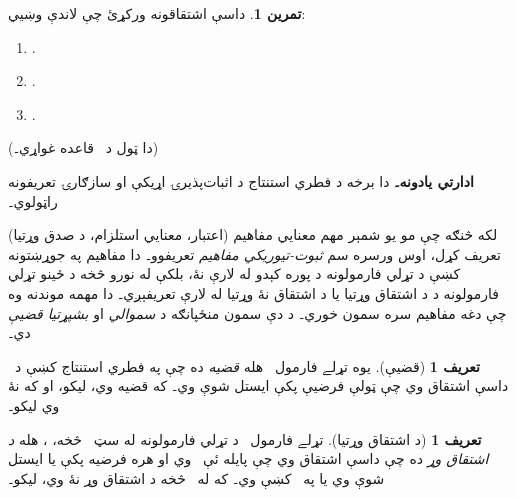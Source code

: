 \documentclass[12pt,a4paper,oneside]{report}
\newcommand{\olfileid}[3]{\gdef\pspart{#1}\gdef\pschapter{#2}\gdef\pssection{#3}}
\gdef\pspart{#2}\gdef\pschapter{#3}\gdef\pssection{}%
\theoremstyle{definition}
\newtheorem{defn}[thm]{تعريف}
\newtheorem{prob}[thm]{تمرين}
\newenvironment{editorial}{\begin{framed}\textbf{ادارتي يادونه۔}\enspace}{\end{framed}}
\newenvironment{explain}{}{}
\begin{document}
\label{olpseg:OLP-0090-B015:start}
\begin{prob}
داسې اشتقاقونه ورکړئ چې لاندې وښيي:
\begin{enumerate}
\item \LR{$\Proves \lnot\lforall[x][!A(x)] \lif \lexists[x][\lnot!A(x)]$}.
\item {}.
\item {}.
\end{enumerate}
(دا ټول د~\LR{$\FalseCl$} قاعده غواړي۔)
\end{prob}
\label{olpseg:OLP-0090-B015:end}

\label{olpseg:OLP-0091-B004:start}
\olfileid{fol}{ntd}{ptn}
\label{olpseg:OLP-0091-B004:end}

\label{olpseg:OLP-0091-B005:start}
\label{olpseg:OLP-0091-B005:end}

\label{olpseg:OLP-0091-B006:start}
\begin{editorial}
دا برخه د فطري استنتاج د اثبات‌پذيرۍ اړيکې او سازګارۍ تعريفونه
راټولوي۔
\end{editorial}
\label{olpseg:OLP-0091-B006:end}

\label{olpseg:OLP-0091-B007:start}
\begin{explain}
لکه څنګه چې مو يو شمېر مهم معنايي مفاهيم (اعتبار، معنايي استلزام،
د صدق وړتيا) تعريف کړل، اوس ورسره سم \emph{ثبوت-تيوريکي مفاهيم}
تعريفوو۔ دا مفاهيم په جوړښتونه کښې د تړلي فارمولونه د پوره
کېدو له لارې نۀ، بلکې له نورو څخه د ځينو تړلي فارمولونه د
د اشتقاق وړتيا يا د اشتقاق نۀ وړتيا له لارې تعريفېږي۔ دا مهمه
موندنه وه چې دغه مفاهيم سره سمون خوري۔ د دې سمون منځپانګه د
\emph{سموالي} او \emph{بشپړتيا قضيې} دي۔
\end{explain}
\label{olpseg:OLP-0091-B007:end}

\label{olpseg:OLP-0091-B008:start}
\begin{defn}[قضيې]
يوه تړلے فارمول~ هله \emph{قضيه} ده چې په فطري استنتاج کښې
د~ داسې اشتقاق وي چې ټولې فرضيې پکې ايستل
شوې وي۔ که  قضيه وي،  ليکو، او که نۀ وي
 ليکو۔
\end{defn}
\label{olpseg:OLP-0091-B008:end}

\label{olpseg:OLP-0091-B009:start}
\begin{defn}[د اشتقاق وړتيا]
تړلے فارمول~ د تړلي فارمولونه له سټ~\LR{$\Gamma$} څخه،
، هله \emph{د اشتقاق وړ} ده چې داسې
اشتقاق وي چې پايله ئې~ وي او هره فرضيه پکې يا
ايستل شوې وي يا په~\LR{$\Gamma$} کښې وي۔ که  له~\LR{$\Gamma$}
څخه د اشتقاق وړ نۀ وي،  ليکو۔
\end{defn}
\label{olpseg:OLP-0091-B009:end}
\end{document}

